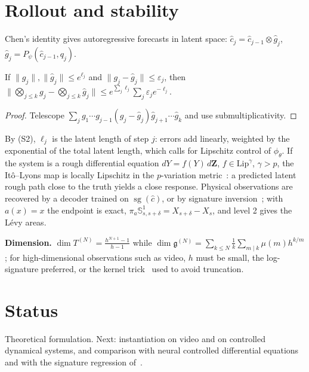\documentclass[10pt,twocolumn]{article}
\newcommand{\Sig}{\mathbb{S}}
\newcommand{\T}{T^{(N)}}
\newcommand{\g}{\mathfrak{g}^{(N)}}
\newcommand{\sg}{\operatorname{sg}}
\begin{document}
\section{Rollout and stability}
Chen's identity gives autoregressive forecasts in latent space: $\hat c_j=\hat c_{j-1}\otimes\hat g_j$, $\hat g_j=P_\psi(\hat c_{j-1},q_j)$.
\begin{lemma}
If $\|g_j\|,\|\hat g_j\|\le e^{\ell_j}$ and $\|g_j-\hat g_j\|\le\varepsilon_j$, then $\|\bigotimes_{j\le k}g_j-\bigotimes_{j\le k}\hat g_j\|\le e^{\sum_j\ell_j}\sum_j\varepsilon_je^{-\ell_j}$.
\end{lemma}
\begin{proof}
Telescope $\sum_jg_1\cdots g_{j-1}(g_j-\hat g_j)\hat g_{j+1}\cdots\hat g_k$ and use submultiplicativity.
\end{proof}
By (S2), $\ell_j$ is the latent length of step $j$: errors add linearly, weighted by the exponential of the total latent length, which calls for Lipschitz control of $\phi_\theta$. If the system is a rough differential equation $dY=f(Y)\,d\mathbf Z$, $f\in\mathrm{Lip}^\gamma$, $\gamma>p$, the Itô--Lyons map is locally Lipschitz in the $p$-variation metric~\cite{lyons1998,friz2014}: a predicted latent rough path close to the truth yields a close response. Physical observations are recovered by a decoder trained on $\sg(\hat c)$, or by signature inversion~\cite{lyonsxu2018}; with $a(x)=x$ the endpoint is exact, $\pi_a\Sig^1_{s,s+\delta}=X_{s+\delta}-X_s$, and level 2 gives the Lévy areas.

\textbf{Dimension.} $\dim\T=\frac{h^{N+1}-1}{h-1}$ while $\dim\g=\sum_{k\le N}\frac1k\sum_{m\mid k}\mu(m)h^{k/m}$; for high-dimensional observations such as video, $h$ must be small, the log-signature preferred, or the kernel trick~\cite{salvi2021} used to avoid truncation.

\section{Status}
Theoretical formulation. Next: instantiation on video and on controlled dynamical systems, and comparison with neural controlled differential equations~\cite{kidger2020} and with the signature regression of~\cite{levin2013}.
\end{document}
